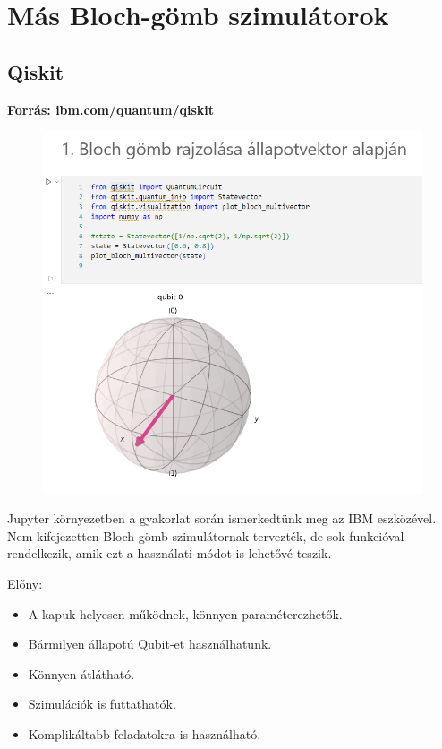\documentclass[fontsize=12pt,a4paper]{article}
\begin{document}


\newpage
\section{Más Bloch-gömb szimulátorok}

\vspace{0.4cm}
\subsection{Qiskit}
\textbf{Forrás: \href{https://www.ibm.com/quantum/qiskit}{ibm.com/quantum/qiskit}} 

\begin{figure}
    \vspace{-0.6cm} %
    \includegraphics[width=0.9\linewidth]{Simulators/Qiskit.png} 
\end{figure}

Jupyter környezetben a gyakorlat során ismerkedtünk meg az IBM eszközével. Nem kifejezetten Bloch-gömb szimulátornak tervezték, de sok funkcióval rendelkezik, amik ezt a használati módot is lehetővé teszik.

Előny:

\begin{itemize}
    \item A kapuk helyesen működnek, könnyen paraméterezhetők.
    \item Bármilyen állapotú Qubit-et használhatunk.
    \item Könnyen átlátható.
    \item Szimulációk is futtathatók.
    \item Komplikáltabb feladatokra is használható.
\end{itemize}
\end{document}
